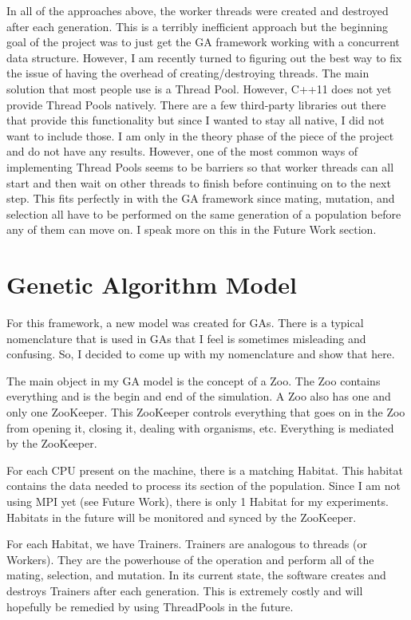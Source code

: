 \documentclass{acm_proc_article-sp}
\begin{document}
In all of the approaches above, the worker threads were created and destroyed after each generation. This is a terribly inefficient approach but the beginning goal of the project was to just get the GA framework working with a concurrent data structure. However, I am recently turned to figuring out the best way to fix the issue of having the overhead of creating/destroying threads. The main solution that most people use is a Thread Pool. However, C++11 does not yet provide Thread Pools natively. There are a few third-party libraries out there that provide this functionality but since I wanted to stay all native, I did not want to include those. I am only in the theory phase of the piece of the project and do not have any results. However, one of the most common ways of implementing Thread Pools seems to be barriers so that worker threads can all start and then wait on other threads to finish before continuing on to the next step. This fits perfectly in with the GA framework since mating, mutation, and selection all have to be performed on the same generation of a population before any of them can move on. I speak more on this in the Future Work section.


%
%
\section{Genetic Algorithm Model}

For this framework, a new model was created for GAs. There is a typical nomenclature that is used in GAs that I feel is sometimes misleading and confusing. So, I decided to come up with my nomenclature and show that here.

The main object in my GA model is the concept of a Zoo. The Zoo contains everything and is the begin and end of the simulation. A Zoo also has one and only one ZooKeeper. This ZooKeeper controls everything that goes on in the Zoo from opening it, closing it, dealing with organisms, etc. Everything is mediated by the ZooKeeper.

For each CPU present on the machine, there is a matching Habitat. This habitat contains the data needed to process its section of the population. Since I am not using MPI yet (see Future Work), there is only 1 Habitat for my experiments. Habitats in the future will be monitored and synced by the ZooKeeper.

For each Habitat, we have Trainers. Trainers are analogous to threads (or Workers). They are the powerhouse of the operation and perform all of the mating, selection, and mutation. In its current state, the software creates and destroys Trainers after each generation. This is extremely costly and will hopefully be remedied by using ThreadPools in the future.
\end{document}
